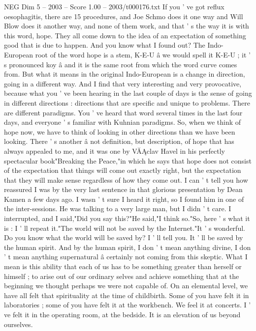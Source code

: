\begin{textsample}{NEG Dim 5 – 2003 – Score 1.00 – 2003/t000176.txt}
If you ' ve got reflux oesophagitis, there are 15 procedures, and Joe Schmo does it one way and Will Blow does it another way, and none of them work, and that ' s the way it is with this word, hope.
They all come down to the idea of an expectation of something good that is due to happen.
And you know what I found out?
The Indo- European root of the word hope is a stem, K-E-U â we would spell it K-E-U ; it ' s pronounced koy â and it is the same root from which the word curve comes from.
But what it means in the original Indo-European is a change in direction, going in a different way.
And I find that very interesting and very provocative, because what you ' ve been hearing in the last couple of days is the sense of going in different directions : directions that are specific and unique to problems.
There are different paradigms.
You ' ve heard that word several times in the last four days, and everyone ' s familiar with Kuhnian paradigms.
So, when we think of hope now, we have to think of looking in other directions than we have been looking.
There ' s another â not definition, but description, of hope that has always appealed to me, and it was one by VĂĄclav Havel in his perfectly spectacular book"Breaking the Peace,"in which he says that hope does not consist of the expectation that things will come out exactly right, but the expectation that they will make sense regardless of how they come out.
I can ' t tell you how reassured I was by the very last sentence in that glorious presentation by Dean Kamen a few days ago.
I wasn ' t sure I heard it right, so I found him in one of the inter-sessions.
He was talking to a very large man, but I didn ' t care.
I interrupted, and I said,"Did you say this?"He said,"I think so."So, here ' s what it is : I ' ll repeat it."The world will not be saved by the Internet."It ' s wonderful.
Do you know what the world will be saved by?
I ' ll tell you.
It ' ll be saved by the human spirit.
And by the human spirit, I don ' t mean anything divine, I don ' t mean anything supernatural â certainly not coming from this skeptic.
What I mean is this ability that each of us has to be something greater than herself or himself ; to arise out of our ordinary selves and achieve something that at the beginning we thought perhaps we were not capable of.
On an elemental level, we have all felt that spirituality at the time of childbirth.
Some of you have felt it in laboratories ; some of you have felt it at the workbench.
We feel it at concerts.
I ' ve felt it in the operating room, at the bedside.
It is an elevation of us beyond ourselves.

\end{textsample}
